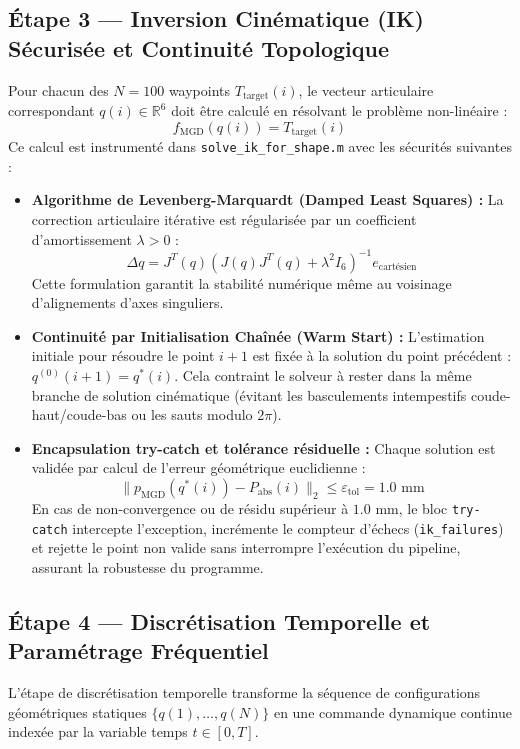 \documentclass[11pt,a4paper]{report}
\begin{document}
\subsection{Étape 3 — Inversion Cinématique (IK) Sécurisée et Continuité Topologique}
Pour chacun des $N=100$ waypoints $T_{\text{target}}(i)$, le vecteur articulaire correspondant $q(i) \in \mathbb{R}^6$ doit être calculé en résolvant le problème non-linéaire :
\begin{equation}
    f_{\text{MGD}}(q(i)) = T_{\text{target}}(i)
\end{equation}
Ce calcul est instrumenté dans \texttt{solve\_ik\_for\_shape.m} avec les sécurités suivantes :
\begin{itemize}
    \item \textbf{Algorithme de Levenberg-Marquardt (Damped Least Squares) :} La correction articulaire itérative est régularisée par un coefficient d'amortissement $\lambda > 0$ :
    \begin{equation}
        \Delta q = J^T(q) \left( J(q)J^T(q) + \lambda^2 I_6 \right)^{-1} e_{\text{cartésien}}
    \end{equation}
    Cette formulation garantit la stabilité numérique même au voisinage d'alignements d'axes singuliers.
    \item \textbf{Continuité par Initialisation Chaînée (Warm Start) :} L'estimation initiale pour résoudre le point $i+1$ est fixée à la solution du point précédent : $q^{(0)}(i+1) = q^*(i)$. Cela contraint le solveur à rester dans la même branche de solution cinématique (évitant les basculements intempestifs coude-haut/coude-bas ou les sauts modulo $2\pi$).
    \item \textbf{Encapsulation try-catch et tolérance résiduelle :} Chaque solution est validée par calcul de l'erreur géométrique euclidienne :
    \begin{equation}
        \| p_{\text{MGD}}(q^*(i)) - P_{\text{abs}}(i) \|_2 \le \varepsilon_{\text{tol}} = 1.0\text{ mm}
    \end{equation}
    En cas de non-convergence ou de résidu supérieur à $1.0\text{ mm}$, le bloc \texttt{try-catch} intercepte l'exception, incrémente le compteur d'échecs (\texttt{ik\_failures}) et rejette le point non valide sans interrompre l'exécution du pipeline, assurant la robustesse du programme.

\end{itemize}

\subsection{Étape 4 — Discrétisation Temporelle et Paramétrage Fréquentiel}
L'étape de discrétisation temporelle transforme la séquence de configurations géométriques statiques $\{q(1), \dots, q(N)\}$ en une commande dynamique continue indexée par la variable temps $t \in [0, T]$.
\end{document}
